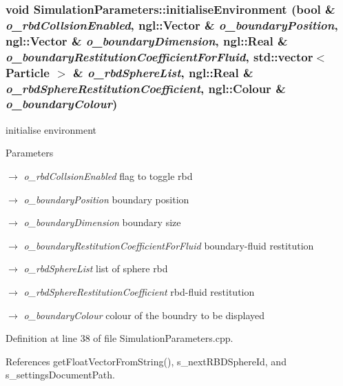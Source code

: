 \hypertarget{class_simulation_parameters_abdf9f384bef40423ebb38515f206b08d}{
\subsubsection[{initialiseEnvironment}]{\setlength{\rightskip}{0pt plus 5cm}void SimulationParameters::initialiseEnvironment (bool \& {\em o\_\-rbdCollsionEnabled}, \/  ngl::Vector \& {\em o\_\-boundaryPosition}, \/  ngl::Vector \& {\em o\_\-boundaryDimension}, \/  ngl::Real \& {\em o\_\-boundaryRestitutionCoefficientForFluid}, \/  std::vector$<$ {\bf Particle} $>$ \& {\em o\_\-rbdSphereList}, \/  ngl::Real \& {\em o\_\-rbdSphereRestitutionCoefficient}, \/  ngl::Colour \& {\em o\_\-boundaryColour})}}
\label{class_simulation_parameters_abdf9f384bef40423ebb38515f206b08d}


initialise environment 


\begin{DoxyParams}{Parameters}
\item[\mbox{$\rightarrow$} {\em o\_\-rbdCollsionEnabled}]flag to toggle rbd \item[\mbox{$\rightarrow$} {\em o\_\-boundaryPosition}]boundary position \item[\mbox{$\rightarrow$} {\em o\_\-boundaryDimension}]boundary size \item[\mbox{$\rightarrow$} {\em o\_\-boundaryRestitutionCoefficientForFluid}]boundary-\/fluid restitution \item[\mbox{$\rightarrow$} {\em o\_\-rbdSphereList}]list of sphere rbd \item[\mbox{$\rightarrow$} {\em o\_\-rbdSphereRestitutionCoefficient}]rbd-\/fluid restitution \item[\mbox{$\rightarrow$} {\em o\_\-boundaryColour}]colour of the boundry to be displayed \end{DoxyParams}


Definition at line 38 of file SimulationParameters.cpp.



References getFloatVectorFromString(), s\_\-nextRBDSphereId, and s\_\-settingsDocumentPath.




